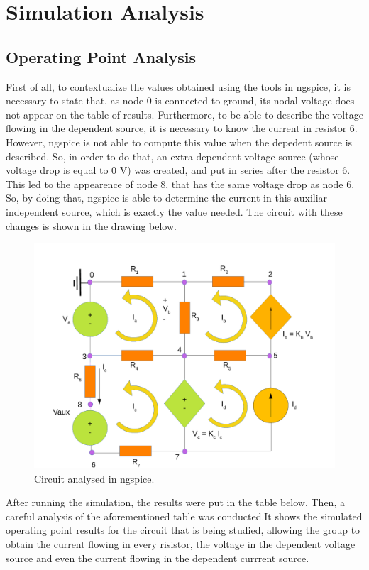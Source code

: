 
\section{Simulation Analysis}
\label{simulation}

\subsection{Operating Point Analysis}
First of all, to contextualize the values obtained using the tools in ngspice, it is necessary to state that, as node 0 is connected to ground, its nodal voltage does not appear on the table of results. Furthermore, to be able to describe the voltage flowing in the dependent source, it is necessary to know the current in resistor 6. However, ngspice is not able to compute this value when the depedent source is described. So, in order to do that, an extra dependent voltage source (whose voltage drop is equal to 0 V) was created, and put in series after the resistor 6. This led to the appearence of node 8, that has the same voltage drop as node 6. So, by doing that, ngspice is able to determine the current in this auxiliar independent source, which is exactly the value needed.
 The circuit with these changes is shown in the drawing below.

\begin{figure}[ht] \centering
\includegraphics[width=1.0\linewidth]{simdraw.pdf}
\caption{Circuit analysed in ngspice.}
\label{simdraw}
\end{figure}


After running the simulation, the results were put in the table below. Then, a careful analysis of the aforementioned table was conducted.It shows the simulated operating point results for the circuit that is being studied, allowing the group to obtain the current flowing in every risistor, the voltage in the dependent voltage source and even the current flowing in the dependent currrent source. 

